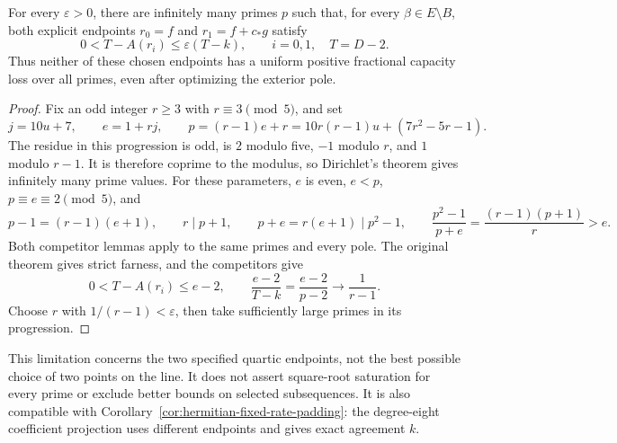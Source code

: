 \begin{proposition}
\label{prop:hermitian-explicit-endpoint-limitation}
For every $\varepsilon>0$, there are infinitely many primes $p$
such that, for every $\beta\in E\setminus B$, both explicit endpoints
$r_0=f$ and $r_1=f+c_*g$ satisfy
\[
 0<T-A(r_i)\le\varepsilon(T-k),\qquad i=0,1,
 \quad T=D-2.
\]
Thus neither of these chosen endpoints has a uniform positive
fractional capacity loss over all primes, even after optimizing
the exterior pole.
\end{proposition}
\begin{proof}
Fix an odd integer $r\ge3$ with $r\equiv3\pmod5$, and set
\[
 j=10u+7,\qquad e=1+rj,\qquad
 p=(r-1)e+r
   =10r(r-1)u+(7r^2-5r-1).
\]
The residue in this progression is odd, is $2$ modulo five,
$-1$ modulo $r$, and $1$ modulo $r-1$.
It is therefore coprime to the modulus, so Dirichlet's theorem
gives infinitely many prime values.
For these parameters, $e$ is even, $e<p$,
$p\equiv e\equiv2\pmod5$, and
\[
 p-1=(r-1)(e+1),\qquad r\mid p+1,\qquad
 p+e=r(e+1)\mid p^2-1,\qquad
 \frac{p^2-1}{p+e}=\frac{(r-1)(p+1)}r>e.
\]
Both competitor lemmas apply to the same primes and every pole.
The original theorem gives strict farness, and the competitors give
\[
 0<T-A(r_i)\le e-2,\qquad
 \frac{e-2}{T-k}=\frac{e-2}{p-2}\longrightarrow\frac1{r-1}.
\]
Choose $r$ with $1/(r-1)<\varepsilon$, then take sufficiently
large primes in its progression.
\end{proof}

This limitation concerns the two specified quartic endpoints, not
the best possible choice of two points on the line. It does not
assert square-root saturation for every prime or exclude better
bounds on selected subsequences. It is also compatible with
Corollary~\ref{cor:hermitian-fixed-rate-padding}: the degree-eight
coefficient projection uses different endpoints and gives exact
agreement $k$.
